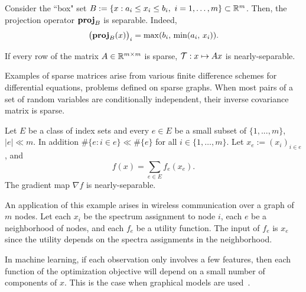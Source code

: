 \begin{example}\label{exp:proj-box}
Consider the ``box" set $B:=\{x:a_i\leq x_i\leq b_i,~i=1,\ldots,m\}\subset\mathbb{R}^m$. Then, the projection operator ${\mathbf{proj}}_{B}$ is separable. Indeed,
$$\big({\mathbf{proj}}_{B}(x)\big)_i=\max(b_i,\,\min(a_i,\, x_i)).$$
\end{example}


\begin{example} If every row of the matrix $A\in\mathbb{R}^{m\times m}$ is sparse,   ${\mathcal{T}} :x\mapsto Ax$ is nearly-separable.

Examples of sparse matrices arise from various finite difference schemes for differential equations, problems defined on sparse graphs. When most pairs of a set of random variables  are conditionally independent, their inverse covariance matrix is sparse.
\end{example}

\begin{example}
Let $E$ be a class of index sets and every $e\in E$ be a small subset of $\{1, ..., m\}$, $|e|\ll m$. In addition $\#\{e:i\in e\}\ll \#\{e\}$ for all $i\in\{1,\ldots,m\}$.
Let $x_e:=(x_i)_{i\in e}$, and  
$$f(x) = \sum_{e \in E} f_e (x_e).$$ 
The gradient map $\nabla f$ is nearly-separable.


An application of this example arises in wireless communication over  a graph of $m$ nodes. Let each $x_i$ be the spectrum assignment to node $i$, each $e$ be a neighborhood of nodes,  and each   $f_e$ be a utility function. The input of $f_e$ is $x_e$ since the utility depends on the spectra assignments in the neighborhood.

In machine learning, if each observation only involves a few features, then each function of the optimization objective will depend on a  small number of components of $x$. This is the case when graphical models are used~\cite{rue2005gaussian,bengio2006label}. 
\end{example}

